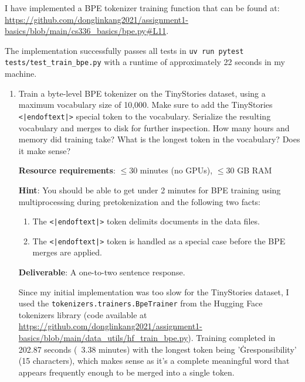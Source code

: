 \begin{answer}
I have implemented a BPE tokenizer training function that can be found at: \url{https://github.com/donglinkang2021/assignment1-basics/blob/main/cs336_basics/bpe.py#L11}.

The implementation successfully passes all tests in \lstinline{uv run pytest tests/test_train_bpe.py} with a runtime of approximately 22 seconds in my machine.
\end{answer}


\begin{enumerate}[label=(\alph*)]
    \item Train a byte-level BPE tokenizer on the TinyStories dataset, using a maximum vocabulary size of 10,000. Make sure to add the TinyStories \lstinline{<|endoftext|>} special token to the vocabulary. Serialize the resulting vocabulary and merges to disk for further inspection. How many hours and memory did training take? What is the longest token in the vocabulary? Does it make sense?
    
    \textbf{Resource requirements}: $\le$30 minutes (no GPUs), $\le$30 GB RAM
    
    \textbf{Hint}: You should be able to get under 2 minutes for BPE training using multiprocessing during pretokenization and the following two facts:
    \begin{enumerate}[label=(\alph*)]
        \item The \lstinline{<|endoftext|>} token delimits documents in the data files.
        \item The \lstinline{<|endoftext|>} token is handled as a special case before the BPE merges are applied.
    \end{enumerate}
    
    \textbf{Deliverable}: A one-to-two sentence response.
    
    \begin{answer}
    Since my initial implementation was too slow for the TinyStories dataset, I used the \lstinline{tokenizers.trainers.BpeTrainer} from the Hugging Face tokenizers library (code available at \url{https://github.com/donglinkang2021/assignment1-basics/blob/main/data_utils/hf_train_bpe.py}). Training completed in 202.87 seconds (~3.38 minutes) with the longest token being 'Ġresponsibility' (15 characters), which makes sense as it's a complete meaningful word that appears frequently enough to be merged into a single token.
    \end{answer}
    

\end{enumerate}
